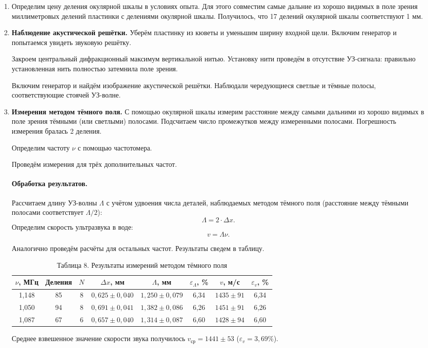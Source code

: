 \documentclass[a4paper]{article}
\begin{document}
\begin{enumerate}
\item Определим цену деления окулярной шкалы в условиях опыта. Для этого совместим самые дальние из хорошо видимых в поле зрения миллиметровых делений пластинки с делениями окулярной шкалы. Получилось, что 17 делений окулярной шкалы соответствуют 1 мм. 

\item \textbf {Наблюдение акустической решётки.} Уберём пластинку из кюветы и уменьшим ширину входной щели. Включим генератор и попытаемся увидеть звуковую решётку.

Закроем центральный дифракционный максимум вертикальной нитью. Установку нити проведём в отсутствие УЗ-сигнала: правильно установленная нить полностью затемнила поле зрения.

Включим генератор и найдём изображение акустической решётки. Наблюдали чередующиеся светлые и тёмные полосы, соответствующие стоячей УЗ-волне.

\item \textbf {Измерения методом тёмного поля.} С помощью окулярной шкалы измерим расстояние между самыми дальними из хорошо видимых в поле зрения тёмными (или светлыми) полосами. Подсчитаем число промежутков между измеренными полосами. Погрешность измерения бралась 2 деления.

Определим частоту $\nu$ с помощью частотомера.

Проведём измерения для трёх дополнительных частот.

\paragraph{Обработка результатов.} Рассчитаем длину УЗ-волны $\Lambda$ с учётом удвоения числа деталей, наблюдаемых методом тёмного поля (расстояние между тёмными полосами соответствует $\Lambda/2$):
$$
\Lambda = 2 \cdot \Delta x.
$$
Определим скорость ультразвука в воде:
$$
v = \Lambda \nu.
$$

Аналогично проведём расчёты для остальных частот. Результаты сведем в таблицу.

\begin{table}[h!]
\centering
\begin{tabular}{|c|c|c|c|c|c|c|c|}
\hline
$\nu$, МГц & Деления & $N$ & $\Delta x$, мм & $\Lambda$, мм & $\varepsilon_\Lambda$, \% & $v$, м/с & $\varepsilon_v$, \% \\
\hline
1,148 & 85 & 8 & $0{,}625 \pm 0{,}040$ & $1{,}250 \pm 0{,}079$ & 6,34 & $1435 \pm 91$ & 6,34 \\ \hline
1,050 & 94 & 8 & $0{,}691 \pm 0{,}041$ & $1{,}382 \pm 0{,}086$ & 6,26 & $1451 \pm 91$ & 6,26 \\ \hline
1,087 & 67 & 6 & $0{,}657 \pm 0{,}040$ & $1{,}314 \pm 0{,}087$ & 6,60 & $1428 \pm 94$ & 6,60 \\ \hline
\end{tabular}%
\caption{Таблица 8. Результаты измерений методом тёмного поля}
\label{tab:dark_field_updated}
\end{table}
Среднее взвешенное значение скорости звука получилось $v_{\text{ср}} = 1441 \pm 53$ ($\varepsilon_v = 3,69 \%$).

\end{enumerate}
\end{document}
